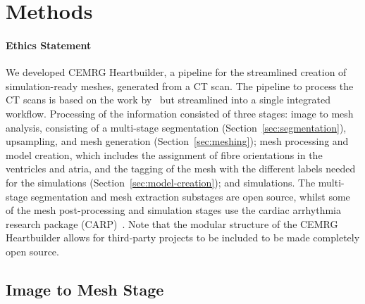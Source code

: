 
\section{Methods}
\paragraph{Ethics Statement}

We developed CEMRG Heartbuilder, a pipeline for the streamlined creation of simulation-ready meshes, 
generated from a CT scan. 
The pipeline to process the CT scans is based on the work by~\cite{strocchi2020_cohort} 
but streamlined into a single integrated workflow.
Processing of the information consisted of three stages: 
image to mesh analysis, consisting of a multi-stage segmentation (Section~\ref{sec:segmentation}), 
upsampling, and mesh generation (Section~\ref{sec:meshing}); 
mesh processing and model creation, which includes the assignment of fibre orientations
in the ventricles and atria, 
and the tagging of the mesh with the different labels needed for the simulations (Section~\ref{sec:model-creation}); 
and simulations. 
The multi-stage segmentation and mesh extraction substages are open source, 
whilst some of the mesh post-processing and simulation stages use the 
cardiac arrhythmia research package (CARP)~\cite{carp-2003}. 
Note that the modular structure of the CEMRG Heartbuilder allows for third-party projects to be 
included to be made completely open source.

\subsection{Image to Mesh Stage}
